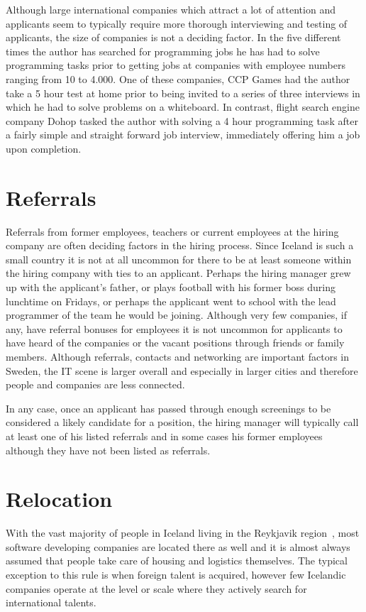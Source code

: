 Although large international companies which attract a lot of attention and applicants seem to typically require more thorough interviewing and testing of applicants, the size of companies is not a deciding factor. In the five different times the author has searched for programming jobs he has had to solve programming tasks prior to getting jobs at companies with employee numbers ranging from 10 to 4.000. One of these companies, CCP Games had the author take a 5 hour test at home prior to being invited to a series of three interviews in which he had to solve problems on a whiteboard. In contrast, flight search engine company Dohop tasked the author with solving a 4 hour programming task after a fairly simple and straight forward job interview, immediately offering him a job upon completion.

\section{Referrals}
Referrals from former employees, teachers or current employees at the hiring company are often deciding factors in the hiring process. Since Iceland is such a small country it is not at all uncommon for there to be at least someone within the hiring company with ties to an applicant. Perhaps the hiring manager grew up with the applicant's father, or plays football with his former boss during lunchtime on Fridays, or perhaps the applicant went to school with the lead programmer of the team he would be joining. Although very few companies, if any, have referral bonuses for employees it is not uncommon for applicants to have heard of the companies or the vacant positions through friends or family members. Although referrals, contacts and networking are important factors in Sweden, the IT scene is larger overall and especially in larger cities and therefore people and companies are less connected. 

In any case, once an applicant has passed through enough screenings to be considered a likely candidate for a position, the hiring manager will typically call at least one of his listed referrals and in some cases his former employees although they have not been listed as referrals. 

\section{Relocation}
With the vast majority of people in Iceland living in the Reykjavik region~\cite{hagstofa}, most software developing companies are located there as well and it is almost always assumed that people take care of housing and logistics themselves. The typical exception to this rule is when foreign talent is acquired, however few Icelandic companies operate at the level or scale where they actively search for international talents. 

